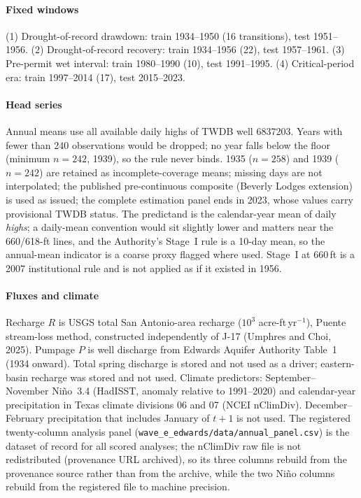 \paragraph{Fixed windows} (1) Drought-of-record drawdown: train 1934--1950 (16 transitions), test 1951--1956. (2) Drought-of-record recovery: train 1934--1956 (22), test 1957--1961. (3) Pre-permit wet interval: train 1980--1990 (10), test 1991--1995. (4) Critical-period era: train 1997--2014 (17), test 2015--2023.

\paragraph{Head series} Annual means use all available daily highs of TWDB well 6837203. Years with fewer than 240 observations would be dropped; no year falls below the floor (minimum $n=242$, 1939), so the rule never binds. 1935 ($n=258$) and 1939 ($n=242$) are retained as incomplete-coverage means; missing days are not interpolated; the published pre-continuous composite (Beverly Lodges extension) is used as issued; the complete estimation panel ends in 2023, whose values carry provisional TWDB status. The predictand is the calendar-year mean of daily \emph{highs}; a daily-mean convention would sit slightly lower and matters near the 660/618-ft lines, and the Authority's Stage~I rule is a 10-day mean, so the annual-mean indicator is a coarse proxy flagged where used. Stage~I at 660\,ft is a 2007 institutional rule and is not applied as if it existed in 1956.

\paragraph{Fluxes and climate} Recharge $R$ is USGS total San Antonio-area recharge ($10^3$ acre-ft\,yr$^{-1}$), Puente stream-loss method, constructed independently of J-17 (Umphres and Choi, 2025). Pumpage $P$ is well discharge from Edwards Aquifer Authority Table~1 (1934 onward). Total spring discharge is stored and not used as a driver; eastern-basin recharge was stored and not used. Climate predictors: September--November Ni\~no~3.4 (HadISST, anomaly relative to 1991--2020) and calendar-year precipitation in Texas climate divisions 06 and 07 (NCEI nClimDiv). December--February precipitation that includes January of $t+1$ is not used. The registered twenty-column analysis panel (\texttt{wave\_e\_edwards/data/annual\_panel.csv}) is the dataset of record for all scored analyses; the nClimDiv raw file is not redistributed (provenance URL archived), so its three columns rebuild from the provenance source rather than from the archive, while the two Ni\~no columns rebuild from the registered file to machine precision.

